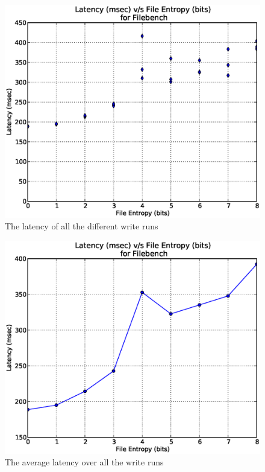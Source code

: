 \begin{figure}
\label{fig:wl}
\begin{center}
\includegraphics[scale=.55]{../results/write_latency_all.eps}
\caption{The latency of all the different write runs}
\end{center}
\end{figure}


\begin{figure}
\label{fig:wlavg}
\begin{center}
\includegraphics[scale=.55]{../results/write_latency_avg.eps}
\caption{The average latency over all the write runs}
\end{center}
\end{figure}

